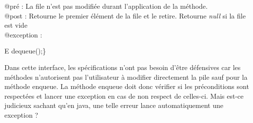 \begin{dequeue}

@pré : La file n'est pas modifiée durant l'application de la méthode. \\
@post : Retourne le premier élément de la file et le retire. Retourne \textit{null} si la file est vide  \\
 @exception : 

E dequeue\left(\right);\right\}\\



\end{dequeue}

\begin{explication}
Dans cette interface, les spécifications n'ont pas besoin d'être défensives car les méthodes n'autorisent pas l'utilisateur à modifier directement la pile sauf pour la méthode enqueue. La méthode enqueue doit donc vérifier si les préconditions sont respectées et lancer une exception en cas de non respect de celles-ci. Mais est-ce judicieux sachant qu'en java, une telle erreur lance automatiquement une exception ?
\end{explication}
